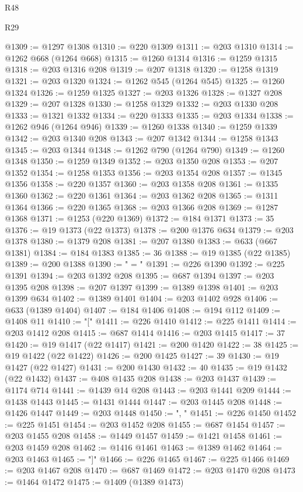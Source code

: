 \begin{lexlean}{R48}
\begin{lexlean}{R29}
\begin{coremodule}
{{{{{{{{{{{{{{{{{{{{{{{{{{{{{{{{{{{{{{{{{{{{{{{{{{{{{{{{{{{{{{{{{{{{{{{{{{{{{{{{{{{{{{{{{{{{{{{{{{{{{{{{{{{{{{{{{{{{{{{{{{{{{{{{{{{{{{{{{{{{{{{{{{{{{{{{{{{{{{{{{{{{{{{{{{{{{{{{{{{{{{{{{{{{{{{{{{{{{{{{{{{{{{{{{{{{{{{{{{@1309 := @1297 @1308
@1310 := @220 @1309
@1311 := @203 @1310
@1314 := @1262 @668 (@1264 @668)
@1315 := @1260 @1314
@1316 := @1259 @1315
@1318 := @203 @1316 @208
@1319 := @207 @1318
@1320 := @1258 @1319
@1321 := @203 @1320
@1324 := @1262 @545 (@1264 @545)
@1325 := @1260 @1324
@1326 := @1259 @1325
@1327 := @203 @1326
@1328 := @1327 @208
@1329 := @207 @1328
@1330 := @1258 @1329
@1332 := @203 @1330 @208
@1333 := @1321 @1332
@1334 := @220 @1333
@1335 := @203 @1334
@1338 := @1262 @946 (@1264 @946)
@1339 := @1260 @1338
@1340 := @1259 @1339
@1342 := @203 @1340 @208
@1343 := @207 @1342
@1344 := @1258 @1343
@1345 := @203 @1344
@1348 := @1262 @790 (@1264 @790)
@1349 := @1260 @1348
@1350 := @1259 @1349
@1352 := @203 @1350 @208
@1353 := @207 @1352
@1354 := @1258 @1353
@1356 := @203 @1354 @208
@1357 := @1345 @1356
@1358 := @220 @1357
@1360 := @203 @1358 @208
@1361 := @1335 @1360
@1362 := @220 @1361
@1364 := @203 @1362 @208
@1365 := @1311 @1364
@1366 := @220 @1365
@1368 := @203 @1366 @208
@1369 := @1287 @1368
@1371 := @1253 (@220 @1369)
@1372 := @184 @1371
@1373 := 35
@1376 := @19 @1373 (@22 @1373)
@1378 := @200 @1376 @634
@1379 := @203 @1378
@1380 := @1379 @208
@1381 := @207 @1380
@1383 := @633 (@667 @1381)
@1384 := @184 @1383
@1385 := 36
@1388 := @19 @1385 (@22 @1385)
@1389 := @200 @1388
@1390 := " = "
@1391 := @226 @1390
@1392 := @225 @1391
@1394 := @203 @1392 @208
@1395 := @687 @1394
@1397 := @203 @1395 @208
@1398 := @207 @1397
@1399 := @1389 @1398
@1401 := @203 @1399 @634
@1402 := @1389 @1401
@1404 := @203 @1402 @928
@1406 := @633 (@1389 @1404)
@1407 := @184 @1406
@1408 := @194 @112
@1409 := @1408 @11
@1410 := "["
@1411 := @226 @1410
@1412 := @225 @1411
@1414 := @203 @1412 @208
@1415 := @687 @1414
@1416 := @203 @1415
@1417 := 37
@1420 := @19 @1417 (@22 @1417)
@1421 := @200 @1420
@1422 := 38
@1425 := @19 @1422 (@22 @1422)
@1426 := @200 @1425
@1427 := 39
@1430 := @19 @1427 (@22 @1427)
@1431 := @200 @1430
@1432 := 40
@1435 := @19 @1432 (@22 @1432)
@1437 := @408 @1435 @208
@1438 := @203 @1437
@1439 := @1174 @714
@1441 := @1439 @14 @208
@1443 := @203 @1441 @209
@1444 := @1438 @1443
@1445 := @1431 @1444
@1447 := @203 @1445 @208
@1448 := @1426 @1447
@1449 := @203 @1448
@1450 := ", "
@1451 := @226 @1450
@1452 := @225 @1451
@1454 := @203 @1452 @208
@1455 := @687 @1454
@1457 := @203 @1455 @208
@1458 := @1449 @1457
@1459 := @1421 @1458
@1461 := @203 @1459 @208
@1462 := @1416 @1461
@1463 := @1389 @1462
@1464 := @203 @1463
@1465 := "]"
@1466 := @226 @1465
@1467 := @225 @1466
@1469 := @203 @1467 @208
@1470 := @687 @1469
@1472 := @203 @1470 @208
@1473 := @1464 @1472
@1475 := @1409 (@1389 @1473)
}}}}}}}}}}}}}}}}}}}}}}}}}}}}}}}}}}}}}}}}}}}}}}}}}}}}}}}}}}}}}}}}}}}}}}}}}}}}}}}}}}}}}}}}}}}}}}}}}}}}}}}}}}}}}}}}}}}}}}}}}}}}}}}}}}}}}}}}}}}}}}}}}}}}}}}}}}}}}}}}}}}}}}}}}}}}}}}}}}}}}}}}}}}}}}}}}}}}}}}}}}}}}}}}}}}}}}}}}}
\end{coremodule}
\end{lexlean}
\end{lexlean}
